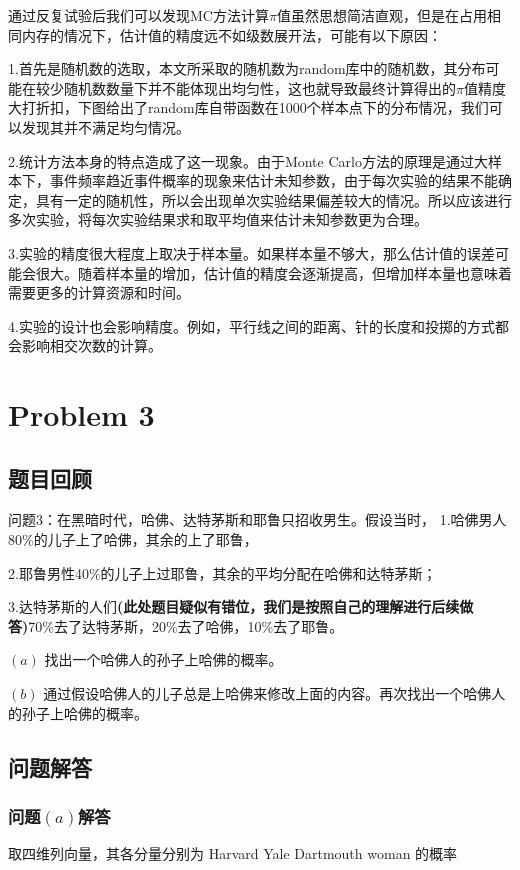 \documentclass[12pt,a4paper]{article}%
\begin{document}
通过反复试验后我们可以发现MC方法计算$\pi$值虽然思想简洁直观，但是在占用相同内存的情况下，估计值的精度远不如级数展开法，可能有以下原因：

1.首先是随机数的选取，本文所采取的随机数为random库中的随机数，其分布可能在较少随机数数量下并不能体现出均匀性，这也就导致最终计算得出的$\pi$值精度大打折扣，下图给出了random库自带函数在1000个样本点下的分布情况，我们可以发现其并不满足均匀情况。

2.统计方法本身的特点造成了这一现象。由于Monte Carlo方法的原理是通过大样本下，事件频率趋近事件概率的现象来估计未知参数，由于每次实验的结果不能确定，具有一定的随机性，所以会出现单次实验结果偏差较大的情况。所以应该进行多次实验，将每次实验结果求和取平均值来估计未知参数更为合理。

3.实验的精度很大程度上取决于样本量。如果样本量不够大，那么估计值的误差可能会很大。随着样本量的增加，估计值的精度会逐渐提高，但增加样本量也意味着需要更多的计算资源和时间。

4.实验的设计也会影响精度。例如，平行线之间的距离、针的长度和投掷的方式都会影响相交次数的计算。

\section{Problem 3}
\subsection{题目回顾}
问题3：在黑暗时代，哈佛、达特茅斯和耶鲁只招收男生。假设当时，
1.哈佛男人80\%的儿子上了哈佛，其余的上了耶鲁，

2.耶鲁男性40\%的儿子上过耶鲁，其余的平均分配在哈佛和达特茅斯；

3.达特茅斯的人们\textbf{(此处题目疑似有错位，我们是按照自己的理解进行后续做答)}70\%去了达特茅斯，20\%去了哈佛，10\%去了耶鲁。

$\left(a\right)$  找出一个哈佛人的孙子上哈佛的概率。

$\left(b\right)$ 通过假设哈佛人的儿子总是上哈佛来修改上面的内容。再次找出一个哈佛人的孙子上哈佛的概率。

\subsection{问题解答}
\subsubsection{问题$\left(a\right)$解答}
取四维列向量，其各分量分别为 Harvard Yale Dartmouth woman 的概率
\end{document}
